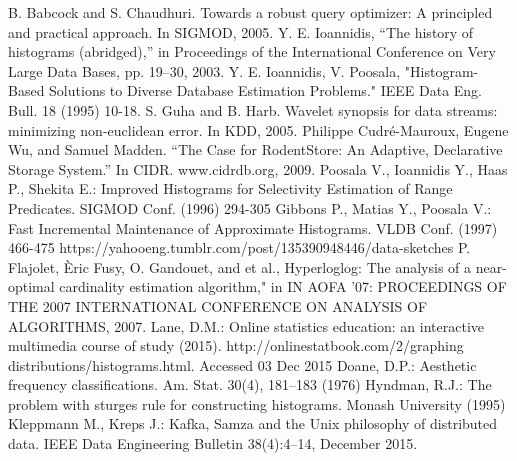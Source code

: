 \documentclass[10pt, conference, compsocconf]{IEEEtran}
\begin{document}
\begin{thebibliography}{1}
B. Babcock and S. Chaudhuri. Towards a robust query optimizer: A principled and practical approach. In SIGMOD, 2005.
Y. E. Ioannidis, “The history of histograms (abridged),” in Proceedings of the International Conference on Very Large Data Bases, pp. 19–30, 2003.
Y. E. Ioannidis, V. Poosala, "Histogram-Based Solutions to
Diverse Database Estimation Problems." IEEE Data Eng. Bull. 18 (1995) 10-18.
S. Guha and B. Harb. Wavelet synopsis for data streams: minimizing non-euclidean error. In KDD, 2005.
Philippe Cudré-Mauroux, Eugene Wu, and Samuel Madden. “The Case for RodentStore: An Adaptive, Declarative Storage System.” In CIDR. www.cidrdb.org, 2009.
Poosala V., Ioannidis Y., Haas P., Shekita E.: Improved Histograms for Selectivity Estimation of Range Predicates. SIGMOD Conf. (1996) 294-305
Gibbons P., Matias Y., Poosala V.: Fast Incremental Maintenance of Approximate Histograms. VLDB Conf. (1997) 466-475
https://yahooeng.tumblr.com/post/135390948446/data-sketches
P. Flajolet, \`{E}ric Fusy, O. Gandouet, and et al., Hyperloglog: The analysis of a near-optimal cardinality estimation algorithm," in IN AOFA '07: PROCEEDINGS OF THE 2007 INTERNATIONAL CONFERENCE ON ANALYSIS OF ALGORITHMS, 2007.
Lane, D.M.: Online statistics education: an interactive multimedia course of study (2015). http://onlinestatbook.com/2/graphing distributions/histograms.html. Accessed 03 Dec 2015
Doane, D.P.: Aesthetic frequency classifications. Am. Stat. 30(4), 181–183 (1976)
Hyndman, R.J.: The problem with sturges rule for constructing histograms. Monash University (1995)
Kleppmann M., Kreps J.: Kafka, Samza and the Unix philosophy of distributed data. IEEE Data Engineering Bulletin 38(4):4–14, December 2015.
\end{thebibliography}
\end{document}
